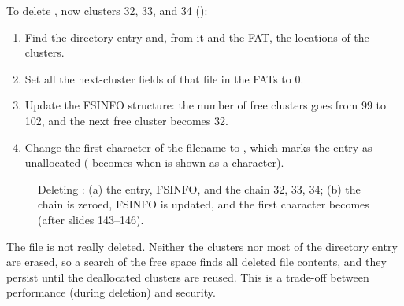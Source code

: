 To delete , now clusters 32, 33, and 34 ():
\begin{enumerate}
  \item Find the directory entry and, from it and the FAT, the locations of the clusters.
  \item Set all the next-cluster fields of that file in the FATs to $0$.
  \item Update the FSINFO structure: the number of free clusters goes from 99 to 102, and the next free cluster becomes 32.
  \item Change the first character of the filename to , which marks the entry as unallocated ( becomes  when  is shown as a character).
\end{enumerate}

\begin{figure}[H]
\centering
{}
\caption{Deleting : (a) the entry, FSINFO, and the chain 32, 33, 34; (b) the chain is zeroed, FSINFO is updated, and the first character becomes  (after slides 143--146).}
\label{fig:fatdelete}
\end{figure}

\begin{keypoint}
  The file is not really deleted. Neither the clusters nor most of the directory entry are erased, so a search of the free space finds all deleted file contents, and they persist until the deallocated clusters are reused. This is a trade-off between performance (during deletion) and security.
\end{keypoint}

